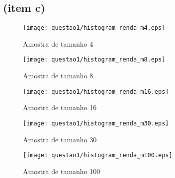 \subsection{(item c)}

\begin{figure}[h]
\begin{minipage}{0.49\textwidth}
	\texttt{[image: questao1/histogram\_renda\_m4.eps]}
	\caption{Amostra de tamanho 4}
	\label{fig:m8}
\end{minipage}
\begin{minipage}{0.49\textwidth}
	\texttt{[image: questao1/histogram\_renda\_m8.eps]}
	\caption{Amostra de tamanho 8}
	\label{fig:m8}
\end{minipage}
\end{figure}

\begin{figure}[h]
\begin{minipage}{0.49\textwidth}
	\texttt{[image: questao1/histogram\_renda\_m16.eps]}
	\caption{Amostra de tamanho 16}
	\label{fig:m16}
\end{minipage}
\begin{minipage}{0.49\textwidth}
	\texttt{[image: questao1/histogram\_renda\_m30.eps]}
	\caption{Amostra de tamanho 30}
	\label{fig:m30}
\end{minipage}
\end{figure}

\begin{figure}[h]
\centering
	\texttt{[image: questao1/histogram\_renda\_m100.eps]}
	\caption{Amostra de tamanho 100}
	\label{fig:m100}
\end{figure}

\FloatBarrier
